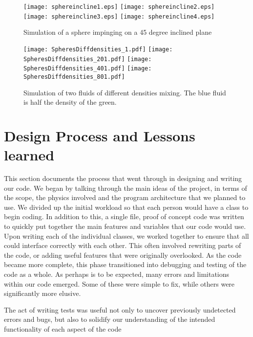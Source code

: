 \documentclass[11pt]{article}
\begin{document}
\begin{figure}
\begin{center}
\texttt{[image: sphereincline1.eps]}
\texttt{[image: sphereincline2.eps]}
\texttt{[image: sphereincline3.eps]}
\texttt{[image: sphereincline4.eps]}
\caption{Simulation of a sphere impinging on a 45 degree inclined plane }
\label{fig:Incline}
\end{center}
\end{figure}

\begin{figure}
\begin{center}
\texttt{[image: SpheresDiffdensities\_1.pdf]}
\texttt{[image: SpheresDiffdensities\_201.pdf]}
\texttt{[image: SpheresDiffdensities\_401.pdf]}
\texttt{[image: SpheresDiffdensities\_801.pdf]}
\caption{Simulation of two fluids of different densities mixing. The blue fluid is half the density of the green.}
\label{fig:Mixing}
\end{center}
\end{figure}


\section{Design Process and Lessons learned}

This section documents the process that went through in designing and writing our code. We began by talking through the main ideas of the project, in terms of the scope, the physics involved and the program architecture that we planned to use. We divided up the initial workload so that each person would have a class to begin coding. In addition to this, a single file, proof of concept code was written to quickly put together the main features and variables that our code would use. Upon writing each of the individual classes, we worked together to ensure that all could interface correctly with each other. This often involved rewriting parts of the code, or adding useful features that were originally overlooked. As the code became more complete, this phase transitioned into debugging and testing of the code as a whole. As perhaps is to be expected, many errors and limitations within our code emerged. Some of these were simple to fix, while others were significantly more elusive. 

The act of writing tests was useful not only to uncover previously undetected errors and bugs, but also to solidify our understanding of the intended functionality of each aspect of the code
\end{document}
